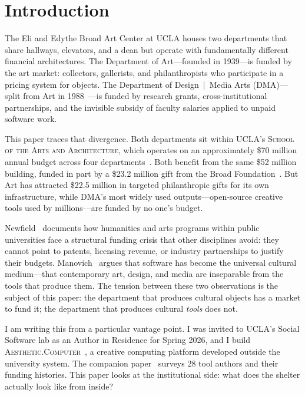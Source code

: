 \documentclass[10pt,letterpaper,twocolumn]{article}
\newcommand{\ac}{\textsc{Aesthetic.Computer}}
\newcommand{\dma}{\textsc{DMA}}
\newcommand{\sofa}{\textsc{School of the Arts and Architecture}}
\begin{document}
\section{Introduction}

The Eli and Edythe Broad Art Center at UCLA houses two departments that share hallways, elevators, and a dean but operate with fundamentally different financial architectures. The Department of Art---founded in 1939---is funded by the art market: collectors, gallerists, and philanthropists who participate in a pricing system for objects. The Department of Design~|~Media Arts (\dma{})---split from Art in 1988~\citep{dmahistory}---is funded by research grants, cross-institutional partnerships, and the invisible subsidy of faculty salaries applied to unpaid software work.

This paper traces that divergence. Both departments sit within UCLA's \sofa{}, which operates on an approximately \$70 million annual budget across four departments~\citep{uclaarts2025about}. Both benefit from the same \$52 million building, funded in part by a \$23.2 million gift from the Broad Foundation~\citep{broadfoundation2006}. But Art has attracted \$22.5 million in targeted philanthropic gifts for its own infrastructure, while \dma{}'s most widely used outputs---open-source creative tools used by millions---are funded by no one's budget.

Newfield~\citep{newfield2009budget} documents how humanities and arts programs within public universities face a structural funding crisis that other disciplines avoid: they cannot point to patents, licensing revenue, or industry partnerships to justify their budgets. Manovich~\citep{manovich2013software} argues that software has become the universal cultural medium---that contemporary art, design, and media are inseparable from the tools that produce them. The tension between these two observations is the subject of this paper: the department that produces cultural objects has a market to fund it; the department that produces cultural \emph{tools} does not.

I am writing this from a particular vantage point. I was invited to UCLA's Social Software lab as an Author in Residence for Spring 2026, and I build \ac{}~\citep{scudder2026ac}, a creative computing platform developed outside the university system. The companion paper~\citep{scudder2026sustainability} surveys 28 tool authors and their funding histories. This paper looks at the institutional side: what does the shelter actually look like from inside?
\end{document}
